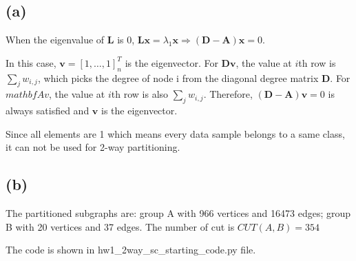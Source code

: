 \documentclass[]{article}
\begin{document}
\subsection*{(a)}
When the eigenvalue of $\mathbf{L}$ is 0, $\mathbf{Lx}=\lambda_1\mathbf{x}\Rightarrow\mathbf{(D-A)x}=0$. 

In this case, $\mathbf{v}=[1,\dots,1]^T_n$ is the eigenvector.  For $\mathbf{Dv}$, the value at $i$th row is $\sum_jw_{i,j}$, which picks the degree of node i from the diagonal degree matrix $\mathbf{D}$. For $mathbf{Av}$, the value at $i$th row is also $\sum_jw_{i,j}$. Therefore, $\mathbf{(D-A)v}=0$ is always satisfied and $\mathbf{v}$ is the eigenvector. 

Since all elements are 1 which means every data sample belongs to a same class, it can not be used for 2-way partitioning.

\subsection*{(b)}
The partitioned subgraphs are: group A with 966 vertices and 16473 edges; group B with 20 vertices and 37 edges. 
The number of cut is $CUT(A, B)=354$

The code is shown in hw1\_2way\_sc\_starting\_code.py file.
\end{document}
